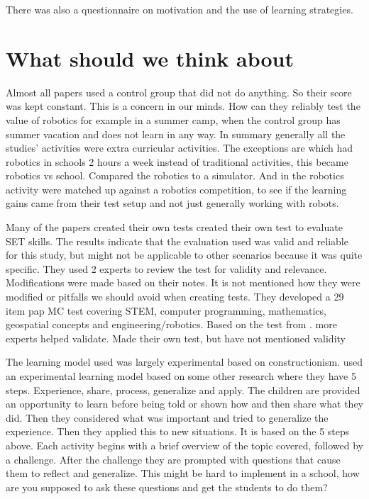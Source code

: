 \bigskip\noindent
\cite{nugent2008effect} There was also a questionnaire on motivation and the use of learning strategies.

\section{What should we think about}
Almost all papers used a control group that did not do anything. So their score was kept constant. This is a concern in our minds. How can they reliably test the value of robotics for example in a summer camp, when the control group has summer vacation and does not learn in any way. In summary generally all the studies' activities were extra curricular activities. The exceptions are \cite{lindh2007does} which had robotics in schools 2 hours a week instead of traditional activities, this became robotics vs school. \cite{mitnik2009collaborative} Compared the robotics to a simulator. And in \cite{silk2011resources} the robotics activity were matched up against a robotics competition, to see if the learning gains came from their test setup and not just generally working with robots.  

\bigskip\noindent
Many of the papers created their own tests
\cite{barker2007robotics} created their own test to evaluate SET skills. The results indicate that the evaluation used was valid and reliable for this study, but might not be applicable to other scenarios because it was quite specific. They used 2 experts to review the test for validity and relevance. Modifications were made based on their notes. It is not mentioned how they were modified or pitfalls we should avoid when creating tests.
\cite{nugent2008effect} They developed a 29 item pap MC test covering STEM, computer programming, mathematics, geospatial concepts and engineering/robotics. Based on the test from \cite{barker2007robotics}. more experts helped validate. 
\cite{williams2007acquisition} Made their own test, but have not mentioned validity

\bigskip\noindent
The learning model used was largely experimental based on constructionism.
\cite{barker2007robotics} used an experimental learning model based on some other research where they have 5 steps. Experience, share, process, generalize and apply. 
\cite{barker2007robotics} The children are provided an opportunity to learn before being told or shown how and then share what they did. Then they considered what was important and tried to generalize the experience. Then they applied this to new situations. It is based on the 5 steps above. 
\cite{barker2007robotics} Each activity begins with a brief overview of the topic covered, followed by a challenge. After the challenge they are prompted with questions that cause them to reflect and generalize. This might be hard to implement in a school, how are you supposed to ask these questions and get the students to do them?

